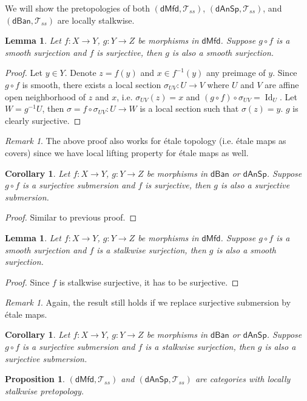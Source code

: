 \documentclass[12pt]{amsart}
\newtheorem{cor}[thm]{Corollary}
\newtheorem{lem}[thm]{Lemma}
\newtheorem{prop}[thm]{Proposition}
\theoremstyle{definition}
\theoremstyle{remark}
\newtheorem{rem}[thm]{Remark}
\numberwithin{equation}{section}
\newcommand{\1}{{\mathbb{1}}}
\newcommand{\dmfd}{\mathsf{dMfd}}
\newcommand{\dan}{\mathsf{dAnSp}}
\newcommand{\dban}{\mathsf{dBan}}
\newcommand{\id}{\operatorname{Id}}
\begin{document}
We will show the pretopologies of both  $(\dmfd,\mathcal{T}_{ss})$, $(\dan, \mathcal{T}_{ss})$, and $(\dban,\mathcal{T}_{ss})$ are locally stalkwise.
\begin{lem}
	Let $f:X\to Y$, $g:Y\to Z$ be morphisms in $\dmfd$. Suppose $g\circ f$ is a smooth surjection and $f$ is surjective, then $g$ is also a smooth surjection.
\end{lem}
\begin{proof}
Let $y\in Y$. Denote $z=f(y)$ and $x\in f^{-1}(y)$ any preimage of $y$. Since $g\circ f$ is smooth, there exists a local section $\sigma_{UV}:U\to V$ where $U$ and $V$ are affine open neighborhood of $z$ and $x$, i.e. $\sigma_{UV}(z)=x$ and $(g\circ f)\circ \sigma_{UV} =\id_U$. Let $W=g^{-1} U$, then $\sigma =f\circ \sigma_{UV}: U \to W$ is a local section such that $\sigma(z)=y$. $g$ is clearly surjective. 
	\end{proof}
	\begin{rem}
	    The above proof also works for \'{e}tale topology (i.e. \'{e}tale maps as covers) since we have local lifting property for  \'{e}tale maps as well.
	\end{rem}
\begin{cor}
    Let $f:X\to Y$, $g:Y\to Z$ be morphisms in $\dban$ or $\dan$. Suppose $g\circ f$ is a surjective submersion and $f$ is surjective, then $g$ is also a surjective submersion.
\end{cor}
\begin{proof}
    Similar to previous proof.
\end{proof}

\begin{lem}
	Let $f:X\to Y$, $g:Y\to Z$ be morphisms in $\dmfd$. Suppose $g\circ f$ is a smooth surjection and $f$ is a stalkwise surjection, then $g$ is also a smooth surjection.
\end{lem}
\begin{proof}Since $f$ is stalkwise surjective, it has to be surjective.
\end{proof}
\begin{rem}
    Again, the result still holds if we replace surjective submersion by  \'{e}tale maps.
\end{rem}
\begin{cor}
Let $f:X\to Y$, $g:Y\to Z$ be morphisms in $\dban$ or $\dan$. Suppose $g\circ f$ is a surjective submersion and $f$ is a stalkwise surjection, then $g$ is also a surjective submersion.
\end{cor}
\begin{prop}
	$(\dmfd,\mathcal{T}_{ss})$ and $(\dan,\mathcal{T}_{ss})$ are categories with locally stalkwise pretopology.
\end{prop}
\end{document}
